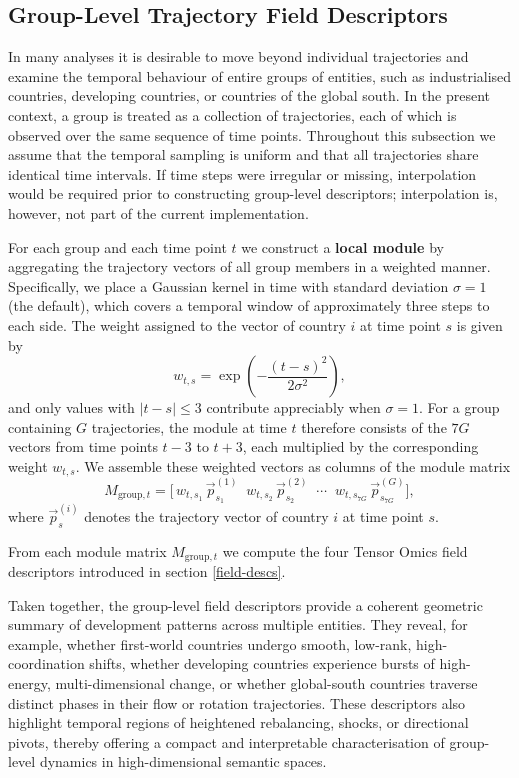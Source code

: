    \subsection{Group-Level Trajectory Field Descriptors}

        In many analyses it is desirable to move beyond individual trajectories and examine the temporal behaviour of entire groups of entities, such as industrialised countries, developing countries, or countries of the global south. In the present context, a group is treated as a collection of trajectories, each of which is observed over the same sequence of time points. Throughout this subsection we assume that the temporal sampling is uniform and that all trajectories share identical time intervals. If time steps were irregular or missing, interpolation would be required prior to constructing group-level descriptors; interpolation is, however, not part of the current implementation.

        For each group and each time point $t$ we construct a \textbf{local module} by aggregating the trajectory vectors of all group members in a weighted manner. Specifically, we place a Gaussian kernel in time with standard deviation $\sigma = 1$ (the default), which covers a temporal window of approximately three steps to each side. The weight assigned to the vector of country $i$ at time point $s$ is given by
        \[
            w_{t,s} = \exp\!\left(-\frac{(t-s)^2}{2\sigma^2}\right),
        \]
        and only values with $|t-s| \leq 3$ contribute appreciably when $\sigma=1$. For a group containing $G$ trajectories, the module at time $t$ therefore consists of the $7G$ vectors from time points $t-3$ to $t+3$, each multiplied by the corresponding weight $w_{t,s}$. We assemble these weighted vectors as columns of the module matrix
        \[
            M_{\mathrm{group},t} = \big[\, w_{t,s_1}\,\vec{p}_{s_1}^{(1)} \;\; w_{t,s_2}\,\vec{p}_{s_2}^{(2)} \;\; \cdots \;\;
            w_{t,s_{7G}}\,\vec{p}_{s_{7G}}^{(G)} \big],
        \]
        where $\vec{p}_{s}^{(i)}$ denotes the trajectory vector of country $i$ at time point $s$.

        From each module matrix $M_{\mathrm{group},t}$ we compute the four Tensor Omics field descriptors introduced in section \ref{field-descs}.

        Taken together, the group-level field descriptors provide a coherent geometric summary of development patterns across multiple entities. They reveal, for example, whether first-world countries undergo smooth, low-rank, high-coordination shifts, whether developing countries experience bursts of high-energy, multi-dimensional change, or whether global-south countries traverse distinct phases in their flow or rotation trajectories. These descriptors also highlight temporal regions of heightened rebalancing, shocks, or directional pivots, thereby offering a compact and interpretable characterisation of group-level dynamics in high-dimensional semantic spaces.